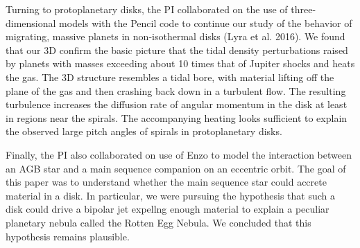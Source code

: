 \documentclass[11pt,preprint]{article}
\begin{document}
Turning to protoplanetary disks, the PI collaborated on the use of three-dimensional models with the Pencil code to continue our study of the behavior of migrating, massive planets in non-isothermal disks (Lyra et al. 2016).  We found that our 3D confirm the basic picture that  the tidal density perturbations raised by planets with masses exceeding about 10 times that of Jupiter shocks and  heats the gas. The 3D structure resembles a tidal bore, with material lifting off the plane of the gas and then crashing back down in a turbulent flow.  The resulting turbulence increases the diffusion rate of angular momentum in the disk at least in regions near the spirals. The accompanying heating looks sufficient to explain the observed large pitch angles of spirals in protoplanetary disks.

Finally, the PI also collaborated on use of Enzo to model the interaction between an AGB star and a main sequence companion on an eccentric orbit.  The goal of this paper was to understand whether the main sequence star could accrete material in a disk. In particular, we were pursuing the hypothesis that such a disk could drive a bipolar jet expellng enough material to explain a peculiar planetary nebula called the Rotten Egg Nebula.  We concluded that this hypothesis remains plausible.
\end{document}
